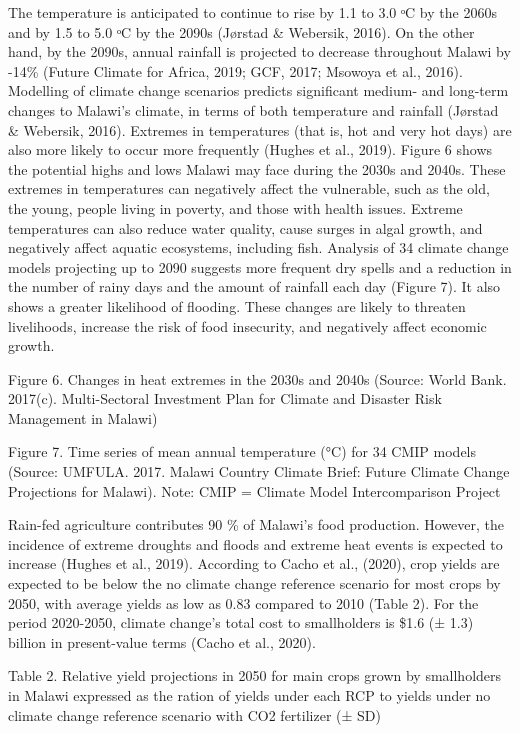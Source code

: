 \documentclass[
]{book}
\begin{document}
The temperature is anticipated to continue to rise by 1.1 to 3.0 ᵒC by the 2060s and by 1.5 to 5.0 ᵒC by the 2090s (Jørstad \& Webersik, 2016). On the other
hand, by the 2090s, annual rainfall is projected to decrease throughout Malawi by -14\% (Future Climate for Africa, 2019; GCF, 2017; Msowoya et al., 2016).
Modelling of climate change scenarios predicts significant medium- and long-term changes to Malawi's climate, in terms of both temperature and rainfall (Jørstad
\& Webersik, 2016). Extremes in temperatures (that is, hot and very hot days) are also more likely to occur more frequently (Hughes et al., 2019). Figure 6 shows
the potential highs and lows Malawi may face during the 2030s and 2040s. These extremes in temperatures can negatively affect the vulnerable, such as the old,
the young, people living in poverty, and those with health issues. Extreme temperatures can also reduce water quality, cause surges in algal growth, and
negatively affect aquatic ecosystems, including fish. Analysis of 34 climate change models projecting up to 2090 suggests more frequent dry spells and a
reduction in the number of rainy days and the amount of rainfall each day (Figure 7). It also shows a greater likelihood of flooding. These changes are likely to
threaten livelihoods, increase the risk of food insecurity, and negatively affect economic growth.

Figure 6. Changes in heat extremes in the 2030s and 2040s (Source: World Bank. 2017(c). Multi-Sectoral Investment Plan for Climate and Disaster Risk Management in Malawi)

Figure 7. Time series of mean annual temperature (°C) for 34 CMIP models (Source: UMFULA. 2017. Malawi Country Climate Brief: Future Climate Change Projections
for Malawi). Note: CMIP = Climate Model Intercomparison Project

Rain-fed agriculture contributes 90 \% of Malawi's food production. However, the incidence of extreme droughts and floods and extreme heat events is expected to
increase (Hughes et al., 2019). According to Cacho et al., (2020), crop yields are expected to be below the no climate change reference scenario for most crops
by 2050, with average yields as low as 0.83 compared to 2010 (Table 2). For the period 2020-2050, climate change's total cost to smallholders is \$1.6 (± 1.3)
billion in present-value terms (Cacho et al., 2020).

Table 2. Relative yield projections in 2050 for main crops grown by smallholders in Malawi expressed as the ration of yields under each RCP to yields under no
climate change reference scenario with CO2 fertilizer (± SD)
\end{document}
